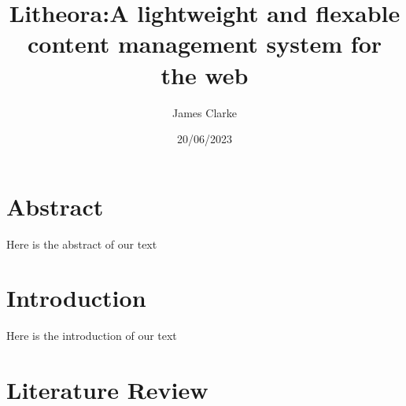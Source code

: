 \documentclass[12pt]{report}
\title{Litheora:\@ A lightweight and flexable content management system for the web}
\author{James Clarke}
\date{20/06/2023}
\begin{document}
\maketitle

\section{Abstract}

Here is the abstract of our text

\section{Introduction}

Here is the introduction of our text

\section{Literature Review}
\end{document}
